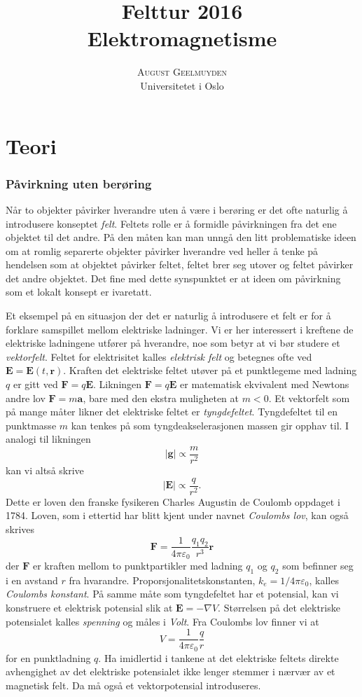 \documentclass[twoside,utf8]{article}
\title{\vspace{-15mm}\fontsize{24pt}{10pt}\selectfont Felttur 2016 \\ \textbf{Elektromagnetisme} } %
\author{
\large
\textsc{August Geelmuyden}\\[2mm] %
\normalsize Universitetet i Oslo \\ %
\vspace{-5mm}
}
\date{}
\begin{document}
\maketitle %




\part*{Teori}

\section{Påvirkning uten berøring}
Når to objekter påvirker hverandre uten å være i berøring er det ofte naturlig å introdusere konseptet {\it felt}. Feltets rolle er å formidle påvirkningen fra det ene objektet til det andre. På den måten kan man unngå den litt problematiske ideen om at romlig separerte objekter påvirker hverandre ved heller å tenke på hendelsen som at objektet påvirker feltet, feltet brer seg utover og feltet påvirker det andre objektet. Det fine med dette synspunktet er at ideen om påvirkning som et lokalt konsept er ivaretatt.

Et eksempel på en situasjon der det er naturlig å introdusere et felt er for å forklare samspillet mellom elektriske ladninger. Vi er her interessert i kreftene de elektriske ladningene utfører på hverandre, noe som betyr at vi bør studere et {\it vektorfelt}. Feltet for elektrisitet kalles {\it elektrisk felt} og betegnes ofte ved
$\mathbf{E}=\mathbf{E}(t,\mathbf{r})$. Kraften det elektriske feltet utøver på et punktlegeme med ladning $q$  er gitt ved $\mathbf{F}=q\mathbf{E}$.
Likningen $\mathbf{F}=q\mathbf{E}$ er matematisk ekvivalent med Newtons andre lov $\mathbf{F}=m\mathbf{a}$, bare med den ekstra muligheten at $m < 0$. Et vektorfelt som på mange måter likner det elektriske feltet er {\it tyngdefeltet}. Tyngdefeltet til en punktmasse $m$ kan tenkes på som tyngdeakselerasjonen massen gir opphav til. I analogi til likningen
$$
|\mathbf{g}| \propto \frac{m}{r^2}
$$
kan vi altså skrive
$$
|\mathbf{E}| \propto \frac{q}{r^2}.
$$
Dette er loven den franske fysikeren Charles Augustin de Coulomb oppdaget i 1784. Loven, som i ettertid har blitt kjent under navnet {\it Coulombs lov}, kan også skrives
$$
\mathbf{F} = \frac{1}{4 \pi \varepsilon_0 } \frac{q_1 q_2}{r^3}\mathbf{r}
$$
der $\mathbf{F}$ er kraften mellom to punktpartikler med ladning  $q_1$ og $q_2$ som befinner seg i en avstand $r$ fra hvarandre. Proporsjonalitetskonstanten, $k_e=1/4 \pi \varepsilon_0$, kalles {\it Coulombs konstant}. På samme måte som tyngdefeltet har et potensial, kan vi konstruere et elektrisk potensial slik at $\mathbf{E}=-\nabla V$. Størrelsen på det elektriske potensialet kalles {\it spenning} og måles i {\it Volt}. Fra Coulombs lov finner vi at
$$
V = \frac{1}{4\pi \varepsilon_0} \frac{q}{r}
$$
for en punktladning $q$. Ha imidlertid i tankene at det elektriske feltets direkte avhengighet av det elektriske potensialet ikke lenger stemmer i nærvær av et magnetisk felt. Da må også et vektorpotensial introduseres.
\end{document}
